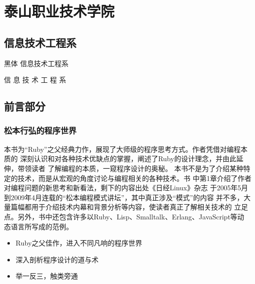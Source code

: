 \documentclass[color=cyan,mathpazo,titlestyle=hang]{elegantbook}
\author{ddswhu \& LiamHuang0205}
\begin{document}
\maketitle
\tableofcontents
\mainmatter



\chapter{泰山职业技术学院}
\section{信息技术工程系}

黑体 信息技术工程系

信 息 技 术 工 程 系






\section{前言部分}
\label{sec:org3aefa91}
\begin{LaTeX}
  \newpage
\end{LaTeX}
\subsection{松本行弘的程序世界}
\label{sec:org8fc65ed}

本书为“Ruby”之父经典力作，展现了大师级的程序思考方式。作者凭借对编程本质的
深刻认识和对各种技术优缺点的掌握，阐述了Ruby的设计理念，并由此延伸，带领读者
了解编程的本质，一窥程序设计的奥秘。
本书不是为了介绍某种特定的技术，而是从宏观的角度讨论与编程相关的各种技术。书
中第1章介绍了作者对编程问题的新思考和新看法，剩下的内容出处《日经Linux》杂志
于2005年5月到2009年4月连载的“松本编程模式讲坛”，其中真正涉及“模式”的内容
并不多，大量篇幅都用于介绍技术内幕和背景分析等内容，使读者真正了解相关技术的
立足点。另外，书中还包含许多以Ruby、Lisp、Smalltalk、Erlang、JavaScript等动
态语言所写成的范例。

\begin{itemize}
\item Ruby之父佳作，进入不同凡响的程序世界
\item 深入剖析程序设计的道与术
\item 举一反三，触类旁通
\end{itemize}
\begin{LaTeX}
  \newpage
\end{LaTeX}
\end{document}
